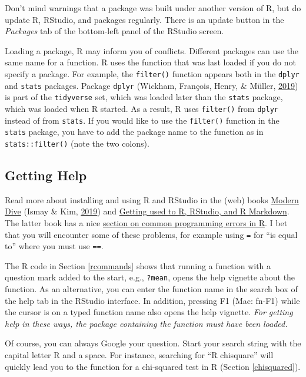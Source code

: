 \documentclass[doc,floatsintext]{apa6}
\begin{document}
Don't mind warnings that a package was built under another version of R,
but do update R, RStudio, and packages regularly. There is an update
button in the \emph{Packages} tab of the bottom-left panel of the
RStudio screen.

Loading a package, R may inform you of conflicts. Different packages can
use the same name for a function. R uses the function that was last
loaded if you do not specify a package. For example, the
\texttt{filter()} function appears both in the \texttt{dplyr} and
\texttt{stats} packages. Package \texttt{dplyr} (Wickham, François,
Henry, \& Müller, \protect\hyperlink{ref-R-dplyr}{2019}) is part of the
\texttt{tidyverse} set, which was loaded later than the \texttt{stats}
package, which was loaded when R started. As a result, R uses
\texttt{filter()} from \texttt{dplyr} instead of from \texttt{stats}. If
you would like to use the \texttt{filter()} function in the
\texttt{stats} package, you have to add the package name to the function
as in \texttt{stats::filter()} (note the two colons).

\subsection{Getting Help}\label{getting-help}

Read more about installing and using R and RStudio in the (web) books
\href{https://moderndive.com/1-getting-started.html}{Modern Dive} (Ismay
\& Kim, \protect\hyperlink{ref-IsmayIntroductionStatisticalData}{2019})
and
\href{https://ismayc.github.io/rbasics-book/3-rstudiobasics.html}{Getting
used to R, RStudio, and R Markdown}. The latter book has a nice
\href{https://ismayc.github.io/rbasics-book/6-errors.html}{section on
common programming errors in R}. I bet that you will encounter some of
these problems, for example using \texttt{=} for \enquote{is equal to}
where you must use \texttt{==}.

The R code in Section \ref{rcommands} shows that running a function with
a question mark added to the start, e.g., \texttt{?mean}, opens the help
vignette about the function. As an alternative, you can enter the
function name in the search box of the help tab in the RStudio
interface. In addition, pressing F1 (Mac: fn-F1) while the cursor is on
a typed function name also opens the help vignette. \emph{For getting
help in these ways, the package containing the function must have been
loaded.}

Of course, you can always Google your question. Start your search string
with the capital letter R and a space. For instance, searching for
\enquote{R chisquare} will quickly lead you to the function for a
chi-squared test in R (Section \ref{chisquared}).
\end{document}
